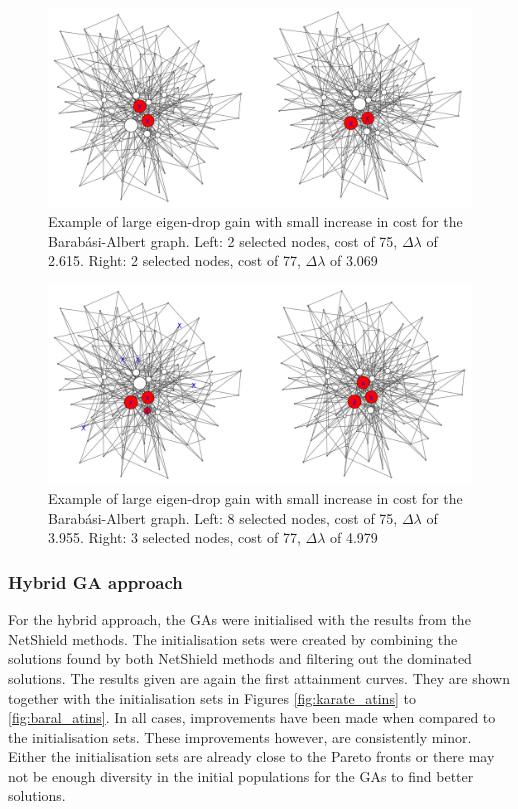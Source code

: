 \documentclass[11pt]{article}
\theoremstyle{definition}
\begin{document}
\begin{figure}[h!]
  \centering
    \includegraphics[width=1\textwidth]{other_img/j2}
  \caption{Example of large eigen-drop gain with small increase in cost for the Barab\'asi-Albert graph.
    Left: 2 selected nodes, cost of 75, $\Delta\lambda$ of 2.615.
    Right: 2 selected nodes, cost of 77, $\Delta\lambda$ of 3.069}
  \label{fig:j2}
\end{figure}

\begin{figure}[h!]
  \centering
    \includegraphics[width=1\textwidth]{other_img/j3}
  \caption{
    Example of large eigen-drop gain with small increase in cost for the Barab\'asi-Albert graph.
    Left: 8 selected nodes, cost of 75, $\Delta\lambda$ of 3.955.
    Right: 3 selected nodes, cost of 77, $\Delta\lambda$ of 4.979}
  \label{fig:j3}
\end{figure}

\clearpage

\subsubsection{Hybrid GA approach}

For the hybrid approach, the GAs were initialised with the results from the NetShield methods. The initialisation sets were created by combining the solutions found by both NetShield methods and filtering out the dominated solutions. The results given are again the first attainment curves. They are shown together with the initialisation sets in Figures \ref{fig:karate_atins} to \ref{fig:baral_atins}. In all cases, improvements have been made when compared to the initialisation sets. These improvements however, are consistently minor. Either the initialisation sets are already close to the Pareto fronts or there may not be enough diversity in the initial populations for the GAs to find better solutions.
\end{document}
